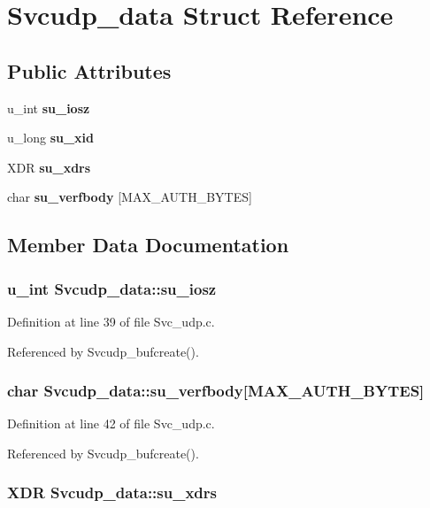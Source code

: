 \section{Svcudp\_\-data Struct Reference}
\label{structSvcudp__data}
\subsection*{Public Attributes}
\begin{CompactItemize}
\item 
u\_\-int {\bf su\_\-iosz}
\item 
u\_\-long {\bf su\_\-xid}
\item 
XDR {\bf su\_\-xdrs}
\item 
char {\bf su\_\-verfbody} [MAX\_\-AUTH\_\-BYTES]
\end{CompactItemize}


\subsection{Member Data Documentation}
\subsubsection{\setlength{\rightskip}{0pt plus 5cm}u\_\-int {\bf Svcudp\_\-data::su\_\-iosz}}\label{structSvcudp__data_o0}




Definition at line 39 of file Svc\_\-udp.c.

Referenced by Svcudp\_\-bufcreate().
\subsubsection{\setlength{\rightskip}{0pt plus 5cm}char {\bf Svcudp\_\-data::su\_\-verfbody}[MAX\_\-AUTH\_\-BYTES]}\label{structSvcudp__data_o3}




Definition at line 42 of file Svc\_\-udp.c.

Referenced by Svcudp\_\-bufcreate().
\subsubsection{\setlength{\rightskip}{0pt plus 5cm}XDR {\bf Svcudp\_\-data::su\_\-xdrs}}\label{structSvcudp__data_o2}




